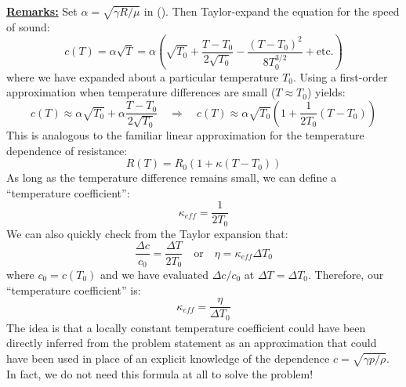 \textbf{\underline{Remarks:}} Set $\alpha = \sqrt{\gamma R / \mu}$ in (). Then Taylor-expand the equation for the speed of sound:
\begin{equation*}
	c(T) = \alpha \sqrt{T} 
	=
	\alpha
	\left(
	\sqrt{T_0}
	+
	\frac{T - T_0}{2 \sqrt{T_0}}
	-
	\frac{ (T - T_0)^2}{8 T_0^{3/2}}
	+
	\text{etc.}
	\right)
\end{equation*}
where we have expanded about a particular temperature $T_0$. Using a first-order approximation when temperature differences are small ($T \approx T_0$) yields:
\begin{equation*}
	c(T) 
	\approx
	\alpha \sqrt{T_0} 
	+
	\alpha \frac{T - T_0}{2 \sqrt{T_0}}
	\quad\Rightarrow\quad
	\boxed{
	c(T) \approx \alpha \sqrt{T_0}
	\left(
	1 + \frac{1}{2T_0}
	\left(T - T_0\right)
	\right)
	}
\end{equation*}
This is analogous to the familiar linear approximation for the temperature dependence of resistance:
\begin{equation*}
	\boxed{R(T) = R_0 (1 + \kappa (T - T_0))}
\end{equation*}
As long as the temperature difference remains small, we can define a ``temperature coefficient'':
\begin{equation*}
	\kappa_{eff} = \frac{1}{2 T_0}
\end{equation*}
We can also quickly check from the Taylor expansion that:
\begin{equation*}
	\frac{\Delta c}{c_0} = \frac{\Delta T}{2 T_0}
	\quad\text{or}\quad
	\eta = \kappa_{eff} \Delta T_0
\end{equation*}
where $c_0 = c(T_0)$ and we have evaluated $\Delta c / c_0$ at $\Delta T = \Delta T_0$. Therefore, our ``temperature coefficient'' is:
\begin{equation*}
	\boxed{\kappa_{eff} = \frac{\eta}{\Delta T_0}}
\end{equation*}
The idea is that a locally constant temperature coefficient could have been directly inferred from the problem statement as an approximation that could have been used in place of an explicit knowledge of the dependence $c = \sqrt{\gamma p / \rho}$. In fact, we do not need this formula at all to solve the problem!